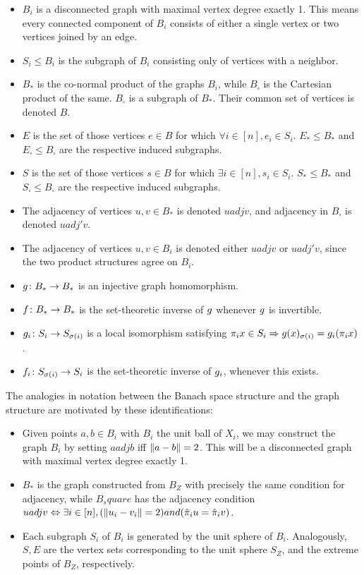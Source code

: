 \documentclass{amsart}
\theoremstyle{definition}
\begin{document}
\begin{itemize}
    \item $B_i$ is a disconnected graph with maximal vertex degree exactly 1. This means every connected component of $B_i$ consists of either a single vertex or two vertices joined by an edge.
    \item $S_i \leq B_i$ is the subgraph of $B_i$ consisting only of vertices with a neighbor.
    \item $B_*$ is the co-normal product of the graphs $B_i$, while $B_\square$ is the Cartesian product of the same. $B_\square$ is a subgraph of $B_*$. Their common set of vertices is denoted $B$.
    \item $E$ is the set of those vertices $e \in B$ for which $\forall i \in [n], e_i \in S_i$. $E_* \leq B_*$ and $E_\square \leq B_\square$ are the respective induced subgraphs.
    \item $S$ is the set of those vertices $s \in B$ for which $\exists i \in [n], s_i \in S_i$. $S_* \leq B_*$ and $S_\square \leq B_\square$ are the respective induced subgraphs.
    \item The adjacency of vertices $u,v \in B_*$ is denoted $u adj v$, and adjacency in $B_\square$ is denoted $u adj' v$.
    \item The adjacency of vertices $u,v \in B_i$ is denoted either $u adj v$ or $u adj' v$, since the two product structures agree on $B_i$.
    \item $g  \colon  B_* \to B_*$ is an injective graph homomorphism.
    \item $f  \colon  B_* \to B_*$ is the set-theoretic inverse of $g$ whenever $g$ is invertible.
    \item $g_i  \colon  S_i \to S_{\sigma(i)}$ is a local isomorphism satisfying $\pi_i x \in S_i \Rightarrow g(x)_{\sigma(i)} = g_i (\pi_i x)$.
    \item $f_i  \colon  S_{\sigma(i)} \to S_i$ is the set-theoretic inverse of $g_i$, whenever this exists.
\end{itemize}

The analogies in notation between the Banach space structure and the graph structure are motivated by these identifications:

\begin{itemize}
    \item Given points $a,b \in B_i$ with $B_i$ the unit ball of $X_i$, we may construct the graph $B_i$ by setting $a adj b$ iff $\norm{a-b} = 2$. This will be a disconnected graph with maximal vertex degree exactly 1.
    \item $B_*$ is the graph constructed from $B_Z$ with precisely the same condition for adjacency, while $B_square$ has the adjacency condition $u adj v \Leftrightarrow \exists i \in [n], (\norm{u_i - v_i} = 2) and (\hat{\pi}_i u = \hat{\pi}_i v)$.
    \item Each subgraph $S_i$ of $B_i$ is generated by the unit sphere of $B_i$. Analogously, $S,E$ are the vertex sets corresponding to the unit sphere $S_Z$, and the extreme points of $B_Z$, respectively.
\end{itemize}
\end{document}
